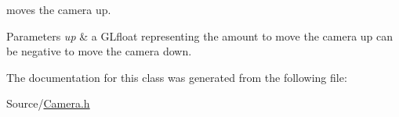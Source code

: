 \label{class_camera_aed6269acf13e7aee9b0b3e8e475f5fd8}
moves the camera up. 
\begin{DoxyParams}{\-Parameters}
{\em up} & a \-G\-Lfloat representing the amount to move the camera up can be negative to move the camera down. \\
\hline
\end{DoxyParams}


\-The documentation for this class was generated from the following file\-:\begin{DoxyCompactItemize}
\item 
\-Source/\hyperlink{_camera_8h}{\-Camera.\-h}\end{DoxyCompactItemize}
